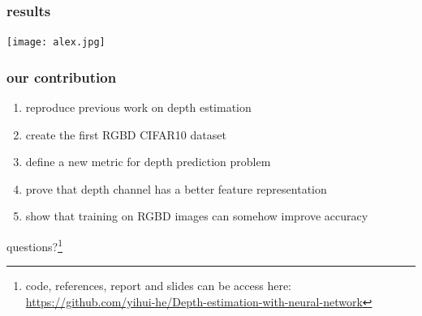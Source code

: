 \documentclass{beamer}
\begin{document}
\begin{frame}
\frametitle{results}
\texttt{[image: alex.jpg]}
\end{frame}



\begin{frame}
\frametitle{our contribution}
\begin{enumerate}
\item reproduce previous work on depth estimation
\item create the first RGBD CIFAR10 dataset
\item define a new metric for depth prediction problem
\item prove that depth channel has a better feature representation 
\item show that training on RGBD images can somehow improve accuracy
\end{enumerate}
\end{frame}


\begin{frame}
\Huge{\centerline{questions?\footnote{code, references, report and slides can be access here:
\href{https://github.com/yihui-he/Depth-estimation-with-neural-network}{https://github.com/yihui-he/Depth-estimation-with-neural-network}}}}
\end{frame}
\end{document}
